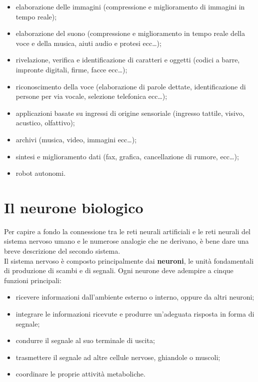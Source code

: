 \documentclass[12pt,a4paper,oneside]{book}
\begin{document}
		\begin{itemize}
			\item elaborazione delle immagini (compressione e miglioramento di immagini in tempo reale);
			\item elaborazione del suono (compressione e miglioramento in tempo reale della voce e della musica, aiuti audio e protesi ecc\dots);
			\item rivelazione, verifica e identificazione di caratteri e oggetti (codici a barre, impronte digitali, firme, facce ecc\dots );  
			\item riconoscimento della voce (elaborazione di parole dettate, identificazione di persone per via vocale, selezione telefonica ecc\dots );
			\item applicazioni basate su ingressi di origine sensoriale (ingresso tattile, visivo, acustico, olfattivo);
			\item archivi (musica, video, immagini ecc\dots);
			\item sintesi e miglioramento dati (fax, grafica, cancellazione di rumore, ecc\dots);
			\item robot autonomi.
		\end{itemize}

		
	\section{Il neurone biologico}
		
		Per capire a fondo la connessione tra le reti neurali artificiali e le reti neurali del sistema nervoso umano e le numerose analogie che ne derivano, è bene dare una breve descrizione del secondo sistema.\\
  		Il sistema nervoso è composto principalmente dai \textbf{neuroni}, le unità fondamentali di produzione di scambi e di segnali. Ogni neurone deve adempire a cinque funzioni principali:
  		
  		\begin{itemize}
  			\item ricevere informazioni dall'ambiente esterno o interno, oppure da altri neuroni;
  			\item integrare le informazioni ricevute e produrre un'adeguata risposta in forma di segnale;
  			\item condurre il segnale al suo terminale di uscita;
  			\item trasmettere il segnale ad altre cellule nervose, ghiandole o muscoli;
  			\item coordinare le proprie attività metaboliche.
  		\end{itemize}
  	
\end{document}
